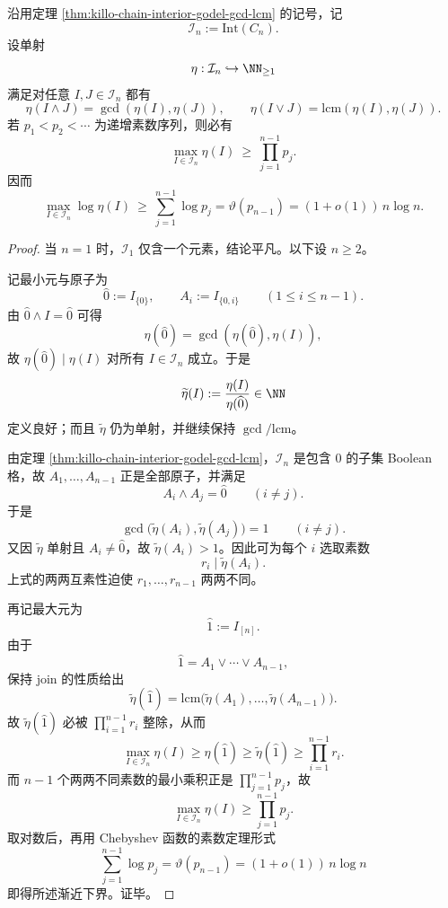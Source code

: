 \begin{theorem}\label{thm:xi-time-part9zl-gcd-lcm-compiler-primorial-lower-bound}
沿用定理 \ref{thm:killo-chain-interior-godel-gcd-lcm} 的记号，记
\[
\mathcal I_n:=\mathrm{Int}(C_n).
\]
设单射
\[
\eta:\mathcal I_n\hookrightarrow \NN_{\ge 1}
\]
满足对任意 \(I,J\in\mathcal I_n\) 都有
\[
\eta(I\wedge J)=\gcd(\eta(I),\eta(J)),
\qquad
\eta(I\vee J)=\mathrm{lcm}(\eta(I),\eta(J)).
\]
若 \(p_1<p_2<\cdots\) 为递增素数序列，则必有
\[
\max_{I\in\mathcal I_n}\eta(I)\ \ge\ \prod_{j=1}^{n-1}p_j.
\]
因而
\[
\max_{I\in\mathcal I_n}\log \eta(I)
\ \ge\
\sum_{j=1}^{n-1}\log p_j
=
\vartheta(p_{n-1})
=
(1+o(1))\,n\log n.
\]
\end{theorem}
\begin{proof}
当 \(n=1\) 时，\(\mathcal I_1\) 仅含一个元素，结论平凡。以下设 \(n\ge 2\)。

记最小元与原子为
\[
\widehat 0:=I_{\{0\}},
\qquad
A_i:=I_{\{0,i\}}
\qquad(1\le i\le n-1).
\]
由 \(\widehat 0\wedge I=\widehat 0\) 可得
\[
\eta(\widehat 0)=\gcd(\eta(\widehat 0),\eta(I)),
\]
故 \(\eta(\widehat 0)\mid \eta(I)\) 对所有 \(I\in\mathcal I_n\) 成立。于是
\[
\widetilde\eta(I):=\frac{\eta(I)}{\eta(\widehat 0)}\in\NN
\]
定义良好；而且 \(\widetilde\eta\) 仍为单射，并继续保持 \(\gcd/\mathrm{lcm}\)。

由定理 \ref{thm:killo-chain-interior-godel-gcd-lcm}，\(\mathcal I_n\) 是包含 \(0\) 的子集 Boolean 格，故 \(A_1,\dots,A_{n-1}\) 正是全部原子，并满足
\[
A_i\wedge A_j=\widehat 0
\qquad(i\neq j).
\]
于是
\[
\gcd\bigl(\widetilde\eta(A_i),\widetilde\eta(A_j)\bigr)=1
\qquad(i\neq j).
\]
又因 \(\widetilde\eta\) 单射且 \(A_i\neq \widehat 0\)，故 \(\widetilde\eta(A_i)>1\)。因此可为每个 \(i\) 选取素数
\[
r_i\mid \widetilde\eta(A_i).
\]
上式的两两互素性迫使 \(r_1,\dots,r_{n-1}\) 两两不同。

再记最大元为
\[
\widehat 1:=I_{[n]}.
\]
由于
\[
\widehat 1=A_1\vee\cdots\vee A_{n-1},
\]
保持 join 的性质给出
\[
\widetilde\eta(\widehat 1)
=
\mathrm{lcm}\bigl(\widetilde\eta(A_1),\dots,\widetilde\eta(A_{n-1})\bigr).
\]
故 \(\widetilde\eta(\widehat 1)\) 必被 \(\prod_{i=1}^{n-1}r_i\) 整除，从而
\[
\max_{I\in\mathcal I_n}\eta(I)
\ge
\eta(\widehat 1)
\ge
\widetilde\eta(\widehat 1)
\ge
\prod_{i=1}^{n-1}r_i.
\]
而 \(n-1\) 个两两不同素数的最小乘积正是 \(\prod_{j=1}^{n-1}p_j\)，故
\[
\max_{I\in\mathcal I_n}\eta(I)\ge \prod_{j=1}^{n-1}p_j.
\]
取对数后，再用 Chebyshev 函数的素数定理形式
\[
\sum_{j=1}^{n-1}\log p_j=\vartheta(p_{n-1})=(1+o(1))\,n\log n
\]
即得所述渐近下界。证毕。
\end{proof}

